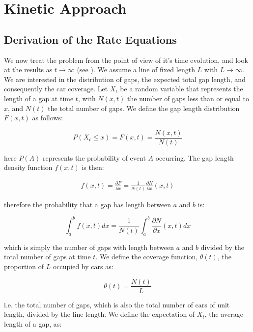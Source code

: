 
\chapter{Kinetic Approach}











\section{Derivation of the Rate Equations}

We now treat the problem from the point of view of it's time evolution, and 
look at the results as $t \to \infty$ (see \cite{krapivsky1992kinetics}). We 
assume a line of fixed length $L$ with $L \to \infty$. We are interested in 
the distribution of gaps, the expected total gap length, and consequently 
the car coverage. Let $X_t$ be a random variable that represents the length 
of a gap at time $t$, with $N(x, t)$ the number of gaps less than or equal 
to $x$, and $N(t)$ the total number of gaps. We define the gap length 
distribution $F(x, t)$ as follows: \bigskip

\[
	P(X_t \leq x) = F(x, t) = \frac{N(x, t)}{N(t)}
\]\medskip

here $P(A)$ represents the probability of event $A$ occurring. The gap length 
density function $f(x, t)$ is then: \bigskip

\begin{eqnarray} \label{eq:10}
	f(x, t) = \frac{\partial F}{\partial x} = \frac{1}{N(t)} \frac{\partial N}{\partial x} (x, t)
\end{eqnarray}\medskip

therefore the probability that a gap has length between $a$ and $b$ is: \bigskip

\[
	\int_{a}^{b} f(x, t) dx = \frac{1}{N(t)} \int_{a}^{b} \frac{\partial N}{\partial x} (x, t) dx
\]\medskip

which is simply the number of gaps with length between $a$ and $b$ divided by 
the total number of gaps at time $t$. We define the coverage function, 
$\theta(t)$, the proportion of $L$ occupied by cars as: \bigskip

\[
	\theta(t) = \frac{N(t)}{L}
\]\medskip

i.e. the total number of gaps, which is also the total number of cars of unit 
length, divided by the line length. We define the expectation of $X_t$, the 
average length of a gap, as: \bigskip

